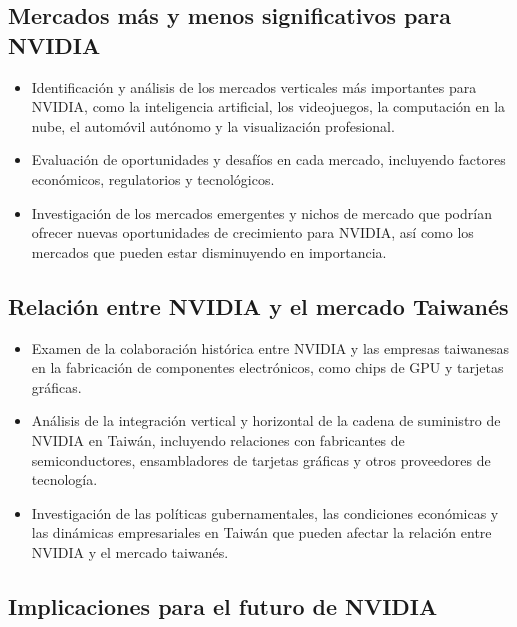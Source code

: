 \documentclass[conference]{IEEEtran}
\begin{document}
\subsection*{Mercados más y menos significativos para NVIDIA}

\begin{itemize}
	\item Identificación y análisis de los mercados verticales más
	      importantes para NVIDIA, como la inteligencia artificial, los
	      videojuegos, la computación en la nube, el automóvil autónomo
	      y la visualización profesional.

	\item Evaluación de oportunidades y desafíos en cada mercado,
	      incluyendo factores económicos, regulatorios y tecnológicos.

	\item Investigación de los mercados emergentes y nichos
	      de mercado que podrían ofrecer nuevas oportunidades de
	      crecimiento para NVIDIA, así como los mercados que pueden
	      estar disminuyendo en importancia.
\end{itemize}

\subsection*{Relación entre NVIDIA y el mercado Taiwanés}

\begin{itemize}
	\item Examen de la colaboración histórica entre NVIDIA y las
	      empresas taiwanesas en la fabricación de componentes
	      electrónicos, como chips de GPU y tarjetas gráficas.

	\item Análisis de la integración vertical y horizontal de la
	      cadena de suministro de NVIDIA en Taiwán, incluyendo
	      relaciones con fabricantes de semiconductores,
	      ensambladores de tarjetas gráficas y otros proveedores de
	      tecnología.

	\item Investigación de las políticas gubernamentales,
	      las condiciones económicas y las dinámicas empresariales en
	      Taiwán que pueden afectar la relación entre NVIDIA y el mercado
	      taiwanés.
\end{itemize}

\subsection*{Implicaciones para el futuro de NVIDIA}
\end{document}
